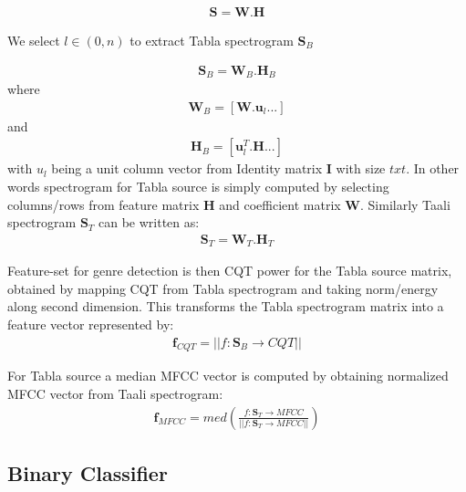 \documentclass{article}
\begin{document}
\begin{align}\label{eq:eq1}
\boldsymbol{S} = \boldsymbol{W}.\boldsymbol{H}
\end{align}

We select $l \in (0,n)$ to extract Tabla spectrogram $\boldsymbol{S}_{B}$ 

\begin{align}\label{eq:eq2}
\boldsymbol{S}_{B} = \boldsymbol{W}_{B}.\boldsymbol{H}_{B}
\end{align}
where
\begin{align}\label{eq:eq3}
\boldsymbol{W}_{B} = [\boldsymbol{W}.\boldsymbol{u}_{l} ...]
\end{align}
and 
\begin{align}\label{eq:eq4}
\boldsymbol{H}_{B} = [\boldsymbol{u}_{l}^T.\boldsymbol{H} ...]
\end{align}
with $u_{l}$ being a unit column vector from Identity matrix $\boldsymbol{I}$ with size $txt$. In other words spectrogram for Tabla source is simply computed
by selecting columns/rows from feature matrix $\boldsymbol{H}$ and coefficient matrix $\boldsymbol{W}$. Similarly Taali spectrogram $\boldsymbol{S}_{T}$ can be written as:
\begin{align}\label{eq:eq5}
\boldsymbol{S}_{T} = \boldsymbol{W}_{T}.\boldsymbol{H}_{T}
\end{align}

Feature-set for genre detection is then CQT power for the Tabla source matrix, obtained by mapping CQT from Tabla spectrogram and taking norm/energy along second dimension. This transforms the Tabla spectrogram matrix into a feature vector represented by:
\begin{align}\label{eq:eq6}
\boldsymbol{f}_{CQT} = \lvert \lvert f\colon \boldsymbol{S}_{B}\to CQT \rvert \rvert
\end{align}

For Tabla source a median MFCC vector is computed by obtaining normalized MFCC vector from Taali spectrogram:
\begin{align}\label{eq:eq7}
\boldsymbol{f}_{MFCC} = med(\frac{f\colon \boldsymbol{S}_{T}\to MFCC}{\lvert \lvert {f\colon \boldsymbol{S}_{T}\to MFCC} \rvert \rvert})
\end{align}

\subsection{Binary Classifier}
\end{document}
